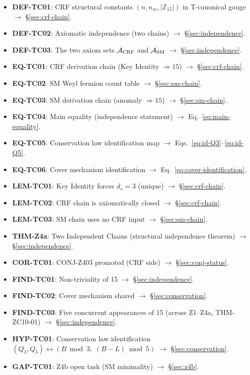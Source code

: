 \documentclass[12pt, a4paper]{article}
\begin{document}
\begin{formalbox}[title={Atomic units introduced by TASK-ZC09 (Z4a)}]
\begin{itemize}[leftmargin=*]
  \item \textbf{DEF-TC01}: CRF structural constants $(n, n_m,
    |\mathbb{Z}_{15}|)$ in T-canonical gauge $\to$ \S\ref{sec:crf-chain}.
  \item \textbf{DEF-TC02}: Axiomatic independence (two chains) $\to$
    \S\ref{sec:independence}.
  \item \textbf{DEF-TC03}: The two axiom sets $\mathcal{A}_{\rm CRF}$
    and $\mathcal{A}_{\rm SM}$ $\to$ \S\ref{sec:independence}.
  \item \textbf{EQ-TC01}: CRF derivation chain
    (Key Identity $\Rightarrow 15$) $\to$ \S\ref{sec:crf-chain}.
  \item \textbf{EQ-TC02}: SM Weyl fermion count table $\to$
    \S\ref{sec:sm-chain}.
  \item \textbf{EQ-TC03}: SM derivation chain (anomaly
    $\Rightarrow 15$) $\to$ \S\ref{sec:sm-chain}.
  \item \textbf{EQ-TC04}: Main equality (independence statement)
    $\to$ Eq.~\eqref{eq:main-equality}.
  \item \textbf{EQ-TC05}: Conservation law identification map
    $\to$ Eqs.~\eqref{eq:id-Q3}--\eqref{eq:id-Q5}.
  \item \textbf{EQ-TC06}: Cover mechanism identification $\to$
    Eq.~\eqref{eq:cover-identification}.
  \item \textbf{LEM-TC01}: Key Identity forces $d_s = 3$ (unique)
    $\to$ \S\ref{sec:crf-chain}.
  \item \textbf{LEM-TC02}: CRF chain is axiomatically closed $\to$
    \S\ref{sec:crf-chain}.
  \item \textbf{LEM-TC03}: SM chain uses no CRF input $\to$
    \S\ref{sec:sm-chain}.
  \item \textbf{THM-Z4a}: Two Independent Chains (structural
    independence theorem) $\to$ \S\ref{sec:independence}.
  \item \textbf{COR-TC01}: CONJ-Z403 promoted (CRF side) $\to$
    \S\ref{sec:conj-status}.
  \item \textbf{FIND-TC01}: Non-triviality of 15 $\to$
    \S\ref{sec:independence}.
  \item \textbf{FIND-TC02}: Cover mechanism shared $\to$
    \S\ref{sec:conservation}.
  \item \textbf{FIND-TC03}: Five concurrent appearances of 15
    (across Z1--Z4a, THM-ZC10-01) $\to$ \S\ref{sec:independence}.
  \item \textbf{HYP-TC01}: Conservation law identification
    $(Q_3, Q_5) \leftrightarrow (B\bmod 3,\; (B-L)\bmod 5)$ $\to$
    \S\ref{sec:conservation}.
  \item \textbf{GAP-TC01}: Z4b open task (SM minimality) $\to$
    \S\ref{sec:z4b}.
\end{itemize}
\end{formalbox}
\end{document}
